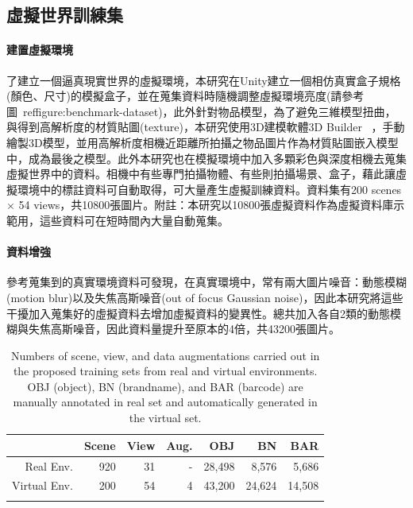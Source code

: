 \subsection{虛擬世界訓練集}
\paragraph{建置虛擬環境}
了建立一個逼真現實世界的虛擬環境，本研究在Unity建立一個相仿真實盒子規格(顏色、尺寸)的模擬盒子，並在蒐集資料時隨機調整虛擬環境亮度(請參考圖~ref{figure:benchmark-dataset})，此外針對物品模型，為了避免三維模型扭曲，與得到高解析度的材質貼圖(texture)，本研究使用3D建模軟體3D Builder ~\cite{3DBuilder}，手動繪製3D模型，並用高解析度相機近距離所拍攝之物品圖片作為材質貼圖嵌入模型中，成為最後之模型。此外本研究也在模擬環境中加入多顆彩色與深度相機去蒐集虛擬世界中的資料。相機中有些專門拍攝物體、有些則拍攝場景、盒子，藉此讓虛擬環境中的標註資料可自動取得，可大量產生虛擬訓練資料。資料集有200 scenes$\times$ 54 views，共10800張圖片。附註：本研究以10800張虛擬資料作為虛擬資料庫示範用，這些資料可在短時間內大量自動蒐集。


\paragraph{資料增強}
參考蒐集到的真實環境資料可發現，在真實環境中，常有兩大圖片噪音：動態模糊(motion blur)以及失焦高斯噪音(out of focus Gaussian noise)，因此本研究將這些干擾加入蒐集好的虛擬資料去增加虛擬資料的變異性。總共加入各自2類的動態模糊與失焦高斯噪音，因此資料量提升至原本的4倍，共43200張圖片。

\begin{table}[ht]
\caption{Numbers of scene, view, and data augmentations carried out in the proposed training sets from real and virtual environments. OBJ (object), BN (brandname), and BAR (barcode) are manually annotated in real set and automatically generated in the virtual set.}
\centering
\begin{tabular}{rrrr|rrr}
\hline
         & Scene & View & Aug. & OBJ       & BN       & BAR \\ \hline
Real Env. 	& 920   & 31   & -        & 28,498       & 8,576    & 5,686     \\
Virtual Env.   	& 200   & 54   & 4      & 43,200       & 24,624         & 14,508          \\
\hline
\label{table:training_set_table}
\end{tabular}
\end{table}

